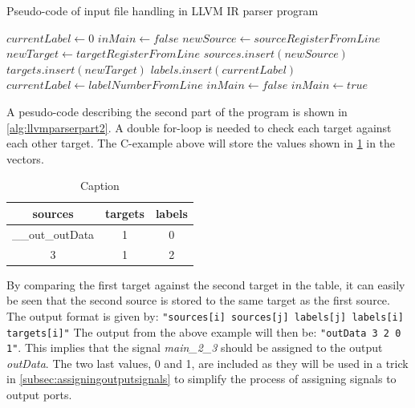 \algnewcommand{}
\algnewcommand{}
\begin{algorithm}
  \caption{Pseudo-code of input file handling in LLVM IR parser program
  \label{alg:llvmparserpart1}}
  \begin{algorithmic}[1]
    \Statex
    \State $currentLabel \leftarrow 0$
    \State $inMain \leftarrow false$
            \State $newSource \leftarrow sourceRegisterFromLine$
            \State $newTarget \leftarrow targetRegisterFromLine$
            \State $sources.insert(newSource)$
            \State $targets.insert(newTarget)$
            \State $labels.insert(currentLabel)$
            \State $currentLabel \leftarrow labelNumberFromLine$
            \State $inMain \leftarrow false$
          \EndIf
          \State $inMain \leftarrow true$
        \EndIf
      \EndWhile
    \EndIf
  \end{algorithmic}
\end{algorithm}
A pesudo-code describing the second part of the program is shown in \cref{alg:llvmparserpart2}. A double for-loop is needed to check each target against each other target. The C-example above will store the values shown in \cref{tab:llvmirparservectors} in the vectors. 
\begin{table}[hbtp]
    \centering
    \begin{tabular}{ccc}
    \textbf{sources} & \textbf{targets} & \textbf{labels} \\
    \toprule
      \_\_out\_outData & 1 & 0 \\
      3 & 1 & 2 \\
    \bottomrule
    \end{tabular}
    \caption{Caption}
    \label{tab:llvmirparservectors}
\end{table}
By comparing the first target against the second target in the table, it can easily be seen that the second source is stored to the same target as the first source. The output format is given by:
\verb!"sources[i] sources[j] labels[j] labels[i] targets[i]"!
The output from the above example will then be:
\verb!"outData 3 2 0 1"!.
This implies that the signal \textit{main\_2\_3} should be assigned to the output \textit{outData}. The two last values, 0 and 1, are included as they will be used in a trick in \cref{subsec:assigningoutputsignals} to simplify the process of assigning signals to output ports.
